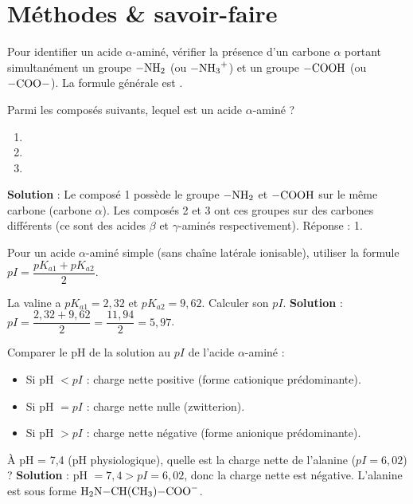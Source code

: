 \section{Méthodes \& savoir-faire}

Pour identifier un acide $\alpha$-aminé, vérifier la présence d'un carbone $\alpha$ portant simultanément un groupe $\ce{-NH2}$ (ou $\ce{-NH3+}$) et un groupe $\ce{-COOH}$ (ou $\ce{-COO-}$). La formule générale est .

\begin{exemple}
Parmi les composés suivants, lequel est un acide $\alpha$-aminé ?
\begin{enumerate}
    \item {}
    \item {}
    \item {}
\end{enumerate}
\textbf{Solution} : Le composé 1 possède le groupe $\ce{-NH2}$ et $\ce{-COOH}$ sur le même carbone (carbone $\alpha$). Les composés 2 et 3 ont ces groupes sur des carbones différents (ce sont des acides $\beta$ et $\gamma$-aminés respectivement). Réponse : 1.
\end{exemple}

Pour un acide $\alpha$-aminé simple (sans chaîne latérale ionisable), utiliser la formule $pI = \dfrac{pK_{a1} + pK_{a2}}{2}$.

\begin{exemple}
La valine a $pK_{a1} = 2,32$ et $pK_{a2} = 9,62$. Calculer son $pI$.
\textbf{Solution} : $pI = \dfrac{2,32 + 9,62}{2} = \dfrac{11,94}{2} = 5,97$.
\end{exemple}

Comparer le pH de la solution au $pI$ de l'acide $\alpha$-aminé :
\begin{itemize}
    \item Si pH $< pI$ : charge nette positive (forme cationique prédominante).
    \item Si pH $= pI$ : charge nette nulle (zwitterion).
    \item Si pH $> pI$ : charge nette négative (forme anionique prédominante).
\end{itemize}

\begin{exemple}
À pH = 7,4 (pH physiologique), quelle est la charge nette de l'alanine ($pI = 6,02$) ?
\textbf{Solution} : pH $= 7,4 > pI = 6,02$, donc la charge nette est négative. L'alanine est sous forme $\ce{H2N-CH(CH3)-COO-}$.
\end{exemple}

